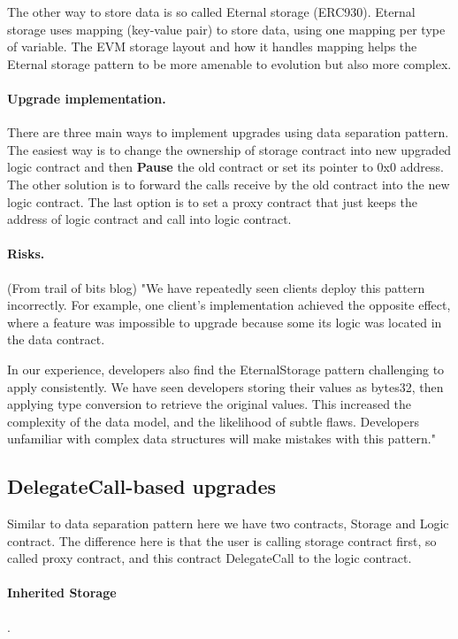 The other way to store data is so called Eternal storage (ERC930). Eternal storage uses mapping (key-value pair) to store data, using one mapping per type of variable. The EVM storage layout and how it handles mapping helps the Eternal storage pattern to be more amenable to evolution but also more complex.

\paragraph{Upgrade implementation. } There are three main ways to implement upgrades using data separation pattern. The easiest way is to change the ownership of storage contract into new upgraded logic contract and then \textbf{Pause} the old contract or set its pointer to 0x0 address. The other solution is to forward the calls receive by the old contract into the new logic contract. The last option is to set a proxy contract that just keeps the address of logic contract and call into logic contract.

\paragraph{Risks. } (From trail of bits blog)
"We have repeatedly seen clients deploy this pattern incorrectly. For example, one client’s implementation achieved the opposite effect, where a feature was impossible to upgrade because some its logic was located in the data contract.

In our experience, developers also find the EternalStorage pattern challenging to apply consistently. We have seen developers storing their values as bytes32, then applying type conversion to retrieve the original values. This increased the complexity of the data model, and the likelihood of subtle flaws. Developers unfamiliar with complex data structures will make mistakes with this pattern."



\subsection{DelegateCall-based upgrades}
Similar to data separation pattern here we have two contracts, Storage and Logic contract. The difference here is that the user is calling storage contract first, so called proxy contract, and this contract DelegateCall to the logic contract.

\paragraph{Inherited Storage}. 

